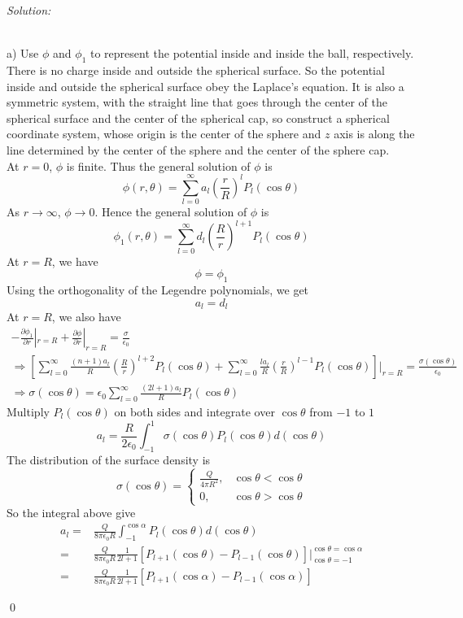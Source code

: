 \documentclass[12pt]{article}
\newenvironment{sol}
    {\emph{Solution:}
    }
    {
    \qed
    }
\begin{document}
\begin{sol}
\\a) Use $\phi$ and $\phi_1$ to represent the potential inside and inside the ball, respectively. There is no charge inside and outside the spherical surface. So the potential inside and outside the spherical surface obey the Laplace's equation. It is also a symmetric system, with the straight line that goes through the center of the spherical surface and the center of the spherical cap, so construct a spherical coordinate system, whose origin is the center of the sphere and $z$ axis is along the line determined by the center of the sphere and the center of the sphere cap.\\
At $r=0$, $\phi$ is finite. Thus the general solution of $\phi$ is
\[
\phi(r,\theta)=\sum_{l=0}^{\infty}a_l(\frac{r}{R})^lP_l(\cos\theta)
\]
As $r\to\infty$, $\phi\to0$. Hence the general solution of $\phi$ is
\[
\phi_1(r,\theta)=\sum_{l=0}^{\infty}d_l(\frac{R}{r})^{l+1}P_l(\cos\theta)
\]
At $r=R$, we have
\[
\phi=\phi_1
\]
Using the orthogonality of the Legendre polynomials, we get
\[
a_l=d_l
\]
At $r=R$, we also have
\begin{gather*}
-\frac{\partial\phi_1}{\partial r}|_{r=R}+\frac{\partial\phi}{\partial r}|_{r=R}=\frac{\sigma}{\epsilon_0}\\
\Longrightarrow[\sum_{l=0}^{\infty}\frac{(n+1)a_l}{R}(\frac{R}{r})^{l+2}P_l(\cos\theta)+\sum_{l=0}^{\infty}\frac{la_l}{R}(\frac{r}{R})^{l-1}P_l(\cos\theta)]|_{r=R}=\frac{\sigma(\cos\theta)}{\epsilon_0}\\
\Longrightarrow\sigma(\cos\theta)=\epsilon_0\sum_{l=0}^{\infty}\frac{(2l+1)a_l}{R}P_l(\cos\theta)
\end{gather*}
Multiply $P_l(\cos\theta)$ on both sides and integrate over $\cos\theta$ from $-1$ to $1$
\[
a_l=\frac{R}{2\epsilon_0}\int_{-1}^{1}\sigma(\cos\theta)P_l(\cos\theta)d(\cos\theta)
\]
The distribution of the surface density is
\[
\sigma(\cos\theta)=\left\{\begin{array}{ll}
\frac{Q}{4\pi R^2},&\cos\theta<\cos\theta\\
0,&\cos\theta>\cos\theta
\end{array}\right.
\]
So the integral above give
\begin{align*}
a_l=&\frac{Q}{8\pi\epsilon_0 R}\int_{-1}^{\cos\alpha}P_l(\cos\theta)d(\cos\theta)\\
=&\frac{Q}{8\pi\epsilon_0 R}\frac{1}{2l+1}[P_{l+1}(\cos\theta)-P_{l-1}(\cos\theta)]|_{\cos\theta=-1}^{\cos\theta=\cos\alpha}\\
=&\frac{Q}{8\pi\epsilon_0 R}\frac{1}{2l+1}[P_{l+1}(\cos\alpha)-P_{l-1}(\cos\alpha)]

\end{align*}
\end{sol}
\end{document}
